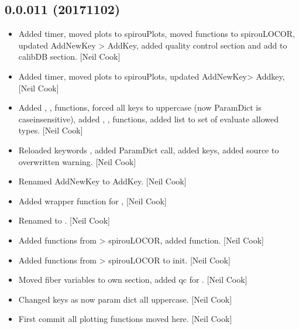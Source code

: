 \documentclass[a4paper,10pt,english]{report}
\begin{document}
\subsection{0.0.011 (2017\sphinxhyphen{}11\sphinxhyphen{}02)}
\label{\detokenize{misc/changelog:id558}}\begin{itemize}
\item {} 
Added timer, moved plots to spirouPlots, moved functions to
spirouLOCOR, updated AddNewKey \textendash{}\textgreater{} AddKey, added quality control
section and add to calibDB section. {[}Neil Cook{]}

\item {} 
Added timer, moved plots to spirouPlots, updated AddNewKey\textendash{}\textgreater{} Addkey,
{[}Neil Cook{]}

\item {} 
Added , ,  functions, forced all keys
to uppercase (now ParamDict is case\sphinxhyphen{}insensitive), added ,
,  functions, added list to set
of evaluate allowed types. {[}Neil Cook{]}

\item {} 
Reloaded keywords , added ParamDict call, added  keys,
added source to overwritten warning. {[}Neil Cook{]}

\item {} 
Renamed AddNewKey to AddKey. {[}Neil Cook{]}

\item {} 
Added wrapper function for  , {[}Neil Cook{]}

\item {} 
Renamed  to
. {[}Neil Cook{]}

\item {} 
Added functions from  \textendash{}\textgreater{} spirouLOCOR, added
 function. {[}Neil Cook{]}

\item {} 
Added functions from  \textendash{}\textgreater{} spirouLOCOR to init. {[}Neil Cook{]}

\item {} 
Moved fiber variables to own section, added qc for . {[}Neil
Cook{]}

\item {} 
Changed keys as now param dict all uppercase. {[}Neil Cook{]}

\item {} 
First commit \sphinxhyphen{} all plotting functions moved here. {[}Neil Cook{]}

\end{itemize}
\end{document}
